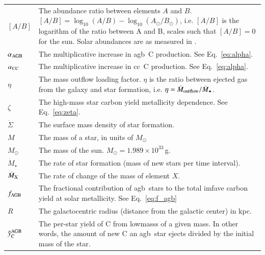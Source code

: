 \documentclass[12pt,oneside,letterpaper]{report}
\newcommand{\cc}{\gls{cc}}
\newcommand{\agb}{\gls{agb}}
\newcommand{\sun}{\odot}
\begin{document}
\setlength{\tabcolsep}{0pt}
\begin{longtable}{p{} p{}}
    $[A/B]$ & 
    The abundance ratio between elements $A$ and $B$. $[A/B] =
    \log_{10}\left(A/B\right) - \log_{10}\left(A_{\sun}/B_{\sun}\right)$, i.e.
    $[A/B]$ is the logarithm of the ratio between A and B, scales such that
    $[A/B]=0$ for the sun. Solar abundances are as measured in
    \citet{asplund+09}. \\
    
$\alpha_{\rm AGB}$ & 
The multiplicative increase in \agb\ C production. See Eq.~\ref{eq:alpha}. \\


$\alpha_{\rm CC}$ &
The multiplicative increase in \cc\ C production. See Eq.~\ref{eq:alpha}. \\

$\eta$ & 
The mass outflow loading factor. $\eta$ is the ratio between ejected gas from the galaxy and star formation, i.e. $\eta = \dot{M}_{\rm outflow}/\dot{M}_\star$. \\

$\zeta$ & 
{The high-mass star carbon yield metallicity dependence. See Eq.~\ref{eq:zeta}}. \\

$\ensuremath{\dot{\Sigma}}$ & 
The surface mass density of star formation. \\

$M$ &
The mass of a star, in units of $M_\odot$ \\

$\ensuremath{M_\odot}$ &
The mass of the sun. $M_\odot = 1.989\times10^{33}$\,g.  \\


$\dot{M}_\star$ & 
The rate of star formation (mass of new stars per time interval). \\

$\dot{M}_{\rm X}$ &
The rate of change of the mass of element $X$. \\

$f_{\rm AGB}$ &
The fractional contribution of \agb\ stars to the total \gls{imfave} carbon yield at solar metallicity. See Eq.~\ref{eq:f_agb} \\ 

$R$ &
The galactocentric radius (distance from the galactic center) in kpc. \\ 

$\tilde{y}_{\rm C}^{\rm AGB}$ &
The per-star yield of C from \glspl{lowmass} of a given mass. In other words, the amount of new C an \agb\ star ejects divided by the initial mass of the star. \\ 


\end{longtable}
\end{document}
